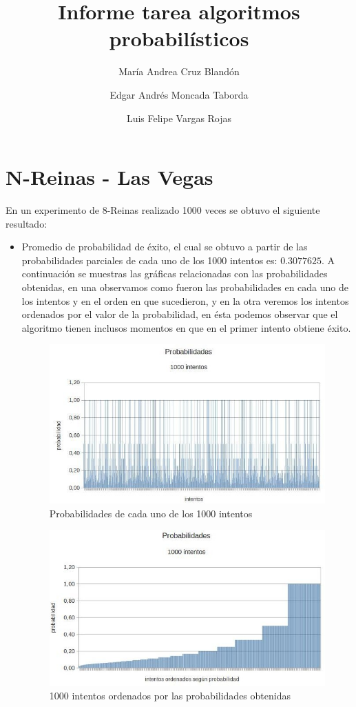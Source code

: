 \documentclass[a4paper,10pt]{article}
\title{Informe tarea algoritmos probabilísticos}
\author{María Andrea Cruz Blandón \and Edgar Andrés Moncada Taborda \and Luis Felipe Vargas Rojas}
\begin{document}
\maketitle

\section{N-Reinas - Las Vegas}

En un experimento de 8-Reinas realizado 1000 veces se obtuvo el siguiente resultado:
\begin{itemize}
 \item Promedio de probabilidad de éxito, el cual se obtuvo a partir de las probabilidades parciales de cada uno de los 1000 intentos es: $0.3077625$. A continuación se muestras las gráficas 
relacionadas con las probabilidades obtenidas, en una observamos como fueron las probabilidades en cada uno de los intentos y en el orden en que sucedieron, y en la otra veremos los intentos
ordenados por el valor de la probabilidad, en ésta podemos observar que el algoritmo tienen inclusos momentos en que en el primer intento obtiene éxito.

\begin{figure}
 \centering
 \includegraphics[scale=0.5]{promedios.jpg}
 \caption{Probabilidades de cada uno de los 1000 intentos}
 \label{fig:promedios}
\end{figure}

\begin{figure}
 \centering
 \includegraphics[scale=0.5]{probabilidadOrdenadas.jpg}
 \caption{1000 intentos ordenados por las probabilidades obtenidas}
 \label{fig:proOrden}
\end{figure}


\end{itemize}
\end{document}
